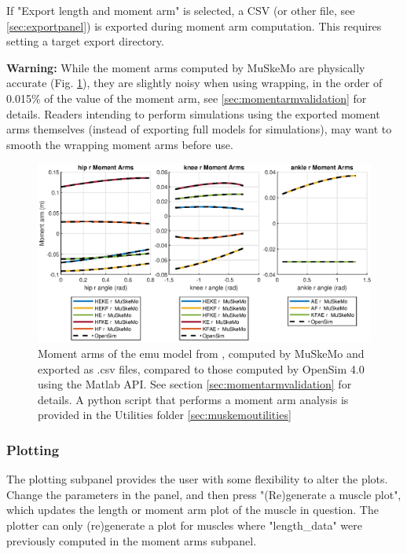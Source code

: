 \documentclass{article}
\begin{document}
If "Export length and moment arm" is selected, a CSV (or other file, see \ref{sec:exportpanel}) is exported during moment arm computation. This requires setting a target export directory.

\textbf{Warning:} While the moment arms computed by MuSkeMo are physically accurate (Fig. \ref{fig:momentarmscombined}), they are slightly noisy when using wrapping, in the order of 0.015\% of the value of the moment arm, see \ref{sec:momentarmvalidation} for details. Readers intending to perform simulations using the exported moment arms themselves (instead of exporting full models for simulations), may want to smooth the wrapping moment arms before use.

\begin{figure}[htb]
    \centering
    \includegraphics[width=1\textwidth]{figures/HKA_momentarms_emu.eps} %
    \caption{Moment arms of the emu model from \cite{vanbijlertMusclecontrolledPhysicsSimulations2024a}, computed by MuSkeMo and exported as .csv files, compared to those computed by OpenSim 4.0 using the Matlab API. See section \ref{sec:momentarmvalidation} for details. A python script that performs a moment arm analysis is provided in the Utilities folder \ref{sec:muskemoutilities}}
    \label{fig:momentarmscombined}
\end{figure}

\subsubsection{Plotting}
\label{sec:plotting}

The plotting subpanel provides the user with some flexibility to alter the plots. Change the parameters in the panel, and then press "(Re)generate a muscle plot", which updates the length or moment arm plot of the muscle in question. The plotter can only (re)generate a plot for muscles where "length\_data" were previously computed in the moment arms subpanel.
\end{document}
